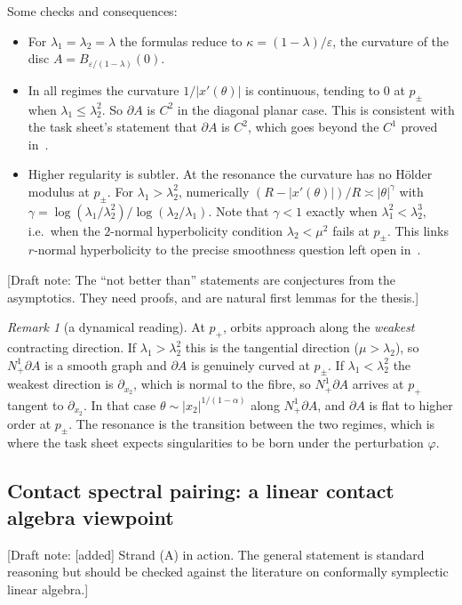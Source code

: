 \documentclass[11pt,a4paper]{article}
\newif\ifdraftnotes \draftnotestrue
\newcommand{\note}[1]{\ifdraftnotes{\color{BrickRed}\textsf{\footnotesize[Draft note: #1]}}\fi}
\theoremstyle{definition}
\theoremstyle{remark}
\newtheorem{remark}[theorem]{Remark}
\newcommand{\eps}{\varepsilon}
\newcommand{\Nb}{N^1_+\partial A}
\begin{document}
Some checks and consequences:
\begin{itemize}
  \item For $\lambda_1=\lambda_2=\lambda$ the formulas reduce to $\kappa=(1-\lambda)/\eps$, the curvature of the disc
  $A=B_{\eps/(1-\lambda)}(0)$.
  \item In all regimes the curvature $1/|x'(\theta)|$ is continuous, tending to $0$ at $p_\pm$ when $\lambda_1\le\lambda_2^2$. So
  $\partial A$ is $C^2$ in the diagonal planar case. This is consistent with the task sheet's statement that $\partial A$ is
  $C^2$, which goes beyond the $C^1$ proved in~\cite{LRT23}.
  \item Higher regularity is subtler. At the resonance the curvature has no H\"older modulus at $p_\pm$. For $\lambda_1>\lambda_2^2$,
  numerically $(R-|x'(\theta)|)/R\asymp|\theta|^{\gamma}$ with $\gamma=\log(\lambda_1/\lambda_2^2)/\log(\lambda_2/\lambda_1)$. Note that
  $\gamma<1$ exactly when $\lambda_1^2<\lambda_2^3$, i.e.\ when the $2$-normal hyperbolicity condition $\lambda_2<\mu^2$ fails at
  $p_\pm$. This links $r$-normal hyperbolicity to the precise smoothness question left open in~\cite{LRT23}.
\end{itemize}
\note{The ``not better than'' statements are conjectures from the asymptotics. They need proofs, and are natural first lemmas for the thesis.}

\begin{remark}[a dynamical reading]\label{rem:dynreading}
At $p_+$, orbits approach along the \emph{weakest} contracting direction. If $\lambda_1>\lambda_2^2$ this is the
tangential direction ($\mu>\lambda_2$), so $\Nb$ is a smooth graph and $\partial A$ is genuinely curved at $p_\pm$. If
$\lambda_1<\lambda_2^2$ the weakest direction is $\partial_{x_2}$, which is normal to the fibre, so $\Nb$ arrives at $p_+$
tangent to $\partial_{x_2}$. In that case $\theta\sim|x_2|^{1/(1-\alpha)}$ along $\Nb$, and $\partial A$ is flat to higher
order at $p_\pm$. The resonance is the transition between the two regimes, which is where the task sheet expects
singularities to be born under the perturbation $\varphi$.
\end{remark}

\subsection{Contact spectral pairing: a linear contact algebra viewpoint}\label{sec:pairing}
\note{[added] Strand (A) in action. The general statement is standard reasoning but should be checked against the literature on conformally symplectic linear algebra.}
\end{document}
